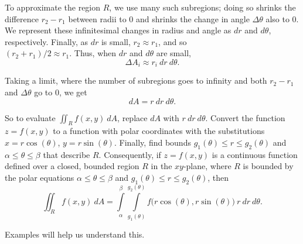 To approximate the region $R$, we use many such subregions; doing so shrinks the difference $r_2-r_1$ between radii to 0 and shrinks the change in angle $\Delta \theta$ also to 0. We represent these infinitesimal changes in radius and angle as $dr$ and $d\theta$, respectively. Finally, as $dr$ is small, $r_2\approx r_1$, and so \\ $(r_2+r_1)/2\approx r_1$. Thus, when $dr$ and $d\theta$ are small, 
$$\Delta A_i \approx r_i\ dr\ d\theta.$$

Taking a limit, where the number of subregions goes to infinity and both $r_2-r_1$ and $\Delta\theta$ go to 0, we get $$dA = r\ dr\ d\theta.$$

So to evaluate $\iint_Rf(x,y)\ dA$, replace $dA$ with $r\ dr\ d\theta$. Convert the function $z=f(x,y)$ to a function with polar coordinates with the substitutions $x=r\cos(\theta)$, $y=r\sin(\theta)$. Finally, find bounds $g_1(\theta)\leq r\leq g_2(\theta)$ and $\alpha\leq\theta\leq\beta$ that describe $R$. Consequently, if $z=f(x,y)$ is a continuous function defined over a closed, bounded region $R$ in the $xy$-plane, where $R$ is
bounded by the polar equations $\alpha\leq\theta\leq\beta$ and  $g_1(\theta)\leq r\leq g_2(\theta)$, then 
\begin{equation}
\iint_Rf(x,y)\ dA = \int\limits_\alpha^\beta\int\limits_{g_1(\theta)}^{g_2(\theta)} f\big(r\cos(\theta),r\sin(\theta)\big)\ r\ dr\ d\theta.
\label{idea:doublepol}
\end{equation}

Examples will help us understand this.


